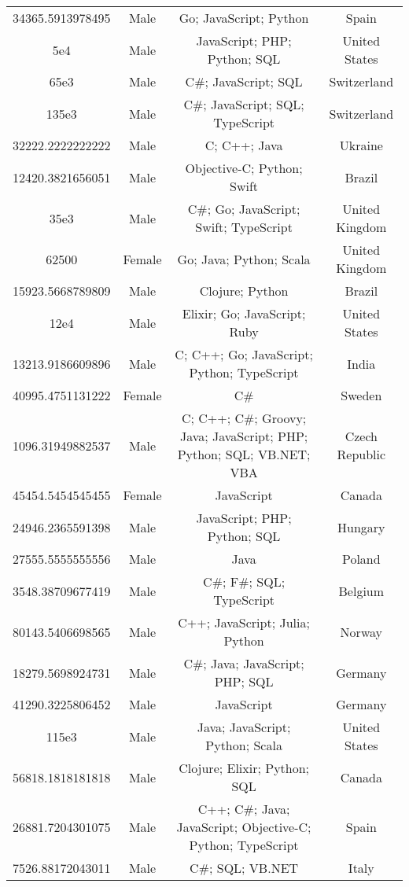 \begin{center}
\begin{tabular}{ |c|c|c|c| }
34365.5913978495  &  Male  &  Go; JavaScript; Python  &  Spain  \\ 
5e4  &  Male  &  JavaScript; PHP; Python; SQL  &  United States  \\ 
65e3  &  Male  &  C\#; JavaScript; SQL  &  Switzerland  \\ 
135e3  &  Male  &  C\#; JavaScript; SQL; TypeScript  &  Switzerland  \\ 
32222.2222222222  &  Male  &  C; C++; Java  &  Ukraine  \\ 
12420.3821656051  &  Male  &  Objective-C; Python; Swift  &  Brazil  \\ 
35e3  &  Male  &  C\#; Go; JavaScript; Swift; TypeScript  &  United Kingdom  \\ 
62500  &  Female  &  Go; Java; Python; Scala  &  United Kingdom  \\ 
15923.5668789809  &  Male  &  Clojure; Python  &  Brazil  \\ 
12e4  &  Male  &  Elixir; Go; JavaScript; Ruby  &  United States  \\ 
13213.9186609896  &  Male  &  C; C++; Go; JavaScript; Python; TypeScript  &  India  \\ 
40995.4751131222  &  Female  &  C\#  &  Sweden  \\ 
1096.31949882537  &  Male  &  C; C++; C\#; Groovy; Java; JavaScript; PHP; Python; SQL; VB.NET; VBA  &  Czech Republic  \\ 
45454.5454545455  &  Female  &  JavaScript  &  Canada  \\ 
24946.2365591398  &  Male  &  JavaScript; PHP; Python; SQL  &  Hungary  \\ 
27555.5555555556  &  Male  &  Java  &  Poland  \\ 
3548.38709677419  &  Male  &  C\#; F\#; SQL; TypeScript  &  Belgium  \\ 
80143.5406698565  &  Male  &  C++; JavaScript; Julia; Python  &  Norway  \\ 
18279.5698924731  &  Male  &  C\#; Java; JavaScript; PHP; SQL  &  Germany  \\ 
41290.3225806452  &  Male  &  JavaScript  &  Germany  \\ 
115e3  &  Male  &  Java; JavaScript; Python; Scala  &  United States  \\ 
56818.1818181818  &  Male  &  Clojure; Elixir; Python; SQL  &  Canada  \\ 
26881.7204301075  &  Male  &  C++; C\#; Java; JavaScript; Objective-C; Python; TypeScript  &  Spain  \\ 
7526.88172043011  &  Male  &  C\#; SQL; VB.NET  &  Italy  \\ 

\end{tabular}
\end{center}
